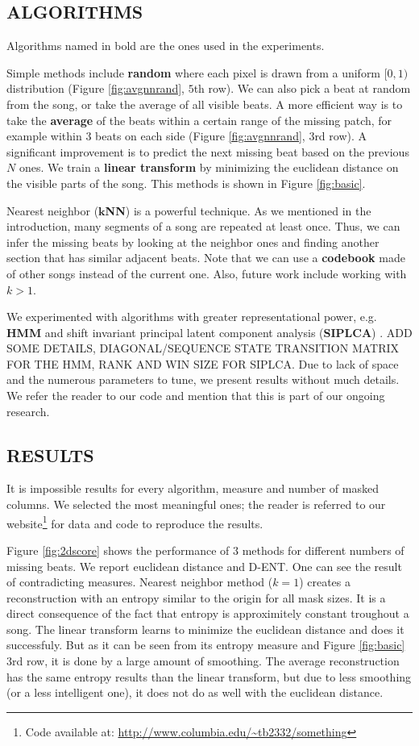 \documentclass{article}
\begin{document}
\subsection{ALGORITHMS}
\label{ssec:algo}
Algorithms named in bold are the ones used in the experiments.

Simple methods include \textbf{random} where each pixel is drawn from a uniform $[0,1)$
distribution (Figure \ref{fig:avgnnrand}, $5$th row). 
We can also pick a beat at random from the song, or take the average
of all visible beats. A more efficient way is to take the \textbf{average} of the beats
within a certain range of the missing patch, for example within $3$ beats on each
side (Figure \ref{fig:avgnnrand}, $3$rd row).
A significant improvement is to predict the next missing beat based on the
previous $N$ ones. We train a \textbf{linear transform} by minimizing the euclidean distance
on the visible parts of the song. This methods is shown in Figure \ref{fig:basic}.

Nearest neighbor ($\mathbf{k}$\textbf{NN}) is a powerful technique. 
As we mentioned in the introduction, many segments
of a song are repeated at least once. Thus, we can infer the missing beats by looking at
the neighbor ones and finding another section that has similar adjacent beats. Note
that we can use a \textbf{codebook} made of other songs instead of the current one. Also, future
work include working with $k > 1$.

We experimented with algorithms with greater representational power, e.g. \textbf{HMM} and
shift invariant principal latent component analysis (\textbf{SIPLCA}) \cite{Weiss2010}.
ADD SOME DETAILS, DIAGONAL/SEQUENCE STATE TRANSITION MATRIX FOR THE HMM, 
RANK AND WIN SIZE FOR SIPLCA.
Due to lack of space and the numerous parameters to tune, we present results without
much details. We refer the reader to our code and mention that this is part of our
ongoing research.


\subsection{RESULTS}
\label{ssec:results}
It is impossible results for every algorithm, measure and number of masked columns.
We selected the most meaningful ones; the reader is referred to our 
website\footnote{Code available at: \url{http://www.columbia.edu/~tb2332/something}}
for data and code to reproduce the results.

Figure \ref{fig:2dscore} shows the performance of $3$ methods for different numbers
of missing beats. We report euclidean distance and D-ENT. One can see the result
of contradicting measures. Nearest neighbor method ($k=1$) creates a reconstruction
with an entropy similar to the origin for all mask sizes. It is a direct consequence
of the fact that entropy is approximitely constant troughout a song. The linear
transform learns to minimize the euclidean distance and does it successfuly. But as it
can be seen from its entropy measure and Figure \ref{fig:basic} $3$rd row, it is
done by a large amount of smoothing. The average reconstruction has the same entropy
results than the linear transform, but due to less smoothing (or a less intelligent
one), it does not do as well with the euclidean distance.
\end{document}
